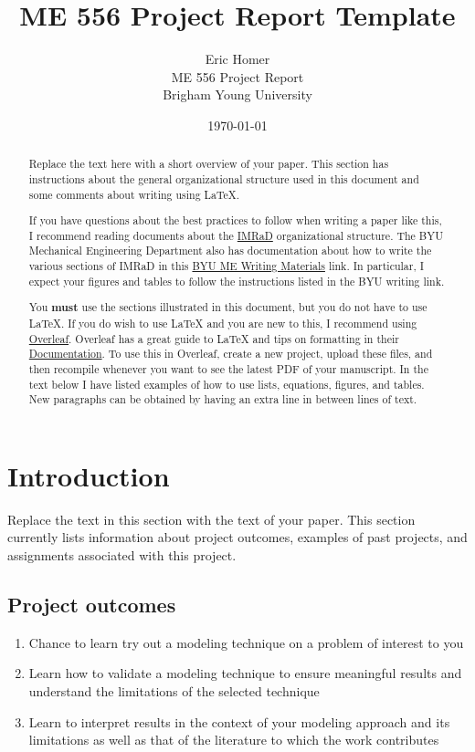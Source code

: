 \documentclass{article}
\title{ME 556 Project Report Template}
\author{Eric Homer\\ ME 556 Project Report \\ Brigham Young University}
\date{\today}
\begin{document}
\maketitle
\begin{abstract}
Replace the text here with a short overview of your paper. This section has instructions about the general organizational structure used in this document and some comments about writing using \LaTeX{}.

If you have questions about the best practices to follow when writing a paper like this, I recommend reading documents about the \href{https://en.wikipedia.org/wiki/IMRAD}{IMRaD} organizational structure. The BYU Mechanical Engineering Department also has documentation about how to write the various sections of IMRaD in this \href{http://me.byu.edu/resources}{BYU ME Writing Materials} link. In particular, I expect your figures and tables to follow the instructions listed in the BYU writing link.

You \textbf{must} use the sections illustrated in this document, but you do not have to use \LaTeX{}. If you do wish to use \LaTeX{} and you are new to this, I recommend using \href{https://www.overleaf.com}{Overleaf}. Overleaf has a great guide to \LaTeX{} and tips on formatting in their \href{https://www.overleaf.com/learn}{Documentation}. To use this in Overleaf, create a new project, upload these files, and then recompile whenever you want to see the latest PDF of your manuscript. In the text below I have listed examples of how to use lists, equations, figures, and tables. New paragraphs can be obtained by having an extra line in between lines of text.



\end{abstract}



\section{Introduction}
\label{sec:intro}
Replace the text in this section with the text of your paper. This section currently lists information about project outcomes, examples of past projects, and assignments associated with this project.

\subsection{Project outcomes}

\begin{enumerate}
    \item Chance to learn try out a modeling technique on a problem of interest to you
    \item Learn how to validate a modeling technique to ensure meaningful results and understand the limitations of the selected technique
    \item Learn to interpret results in the context of your modeling approach and its limitations as well as that of the literature to which the work contributes

\end{enumerate}
\end{document}
